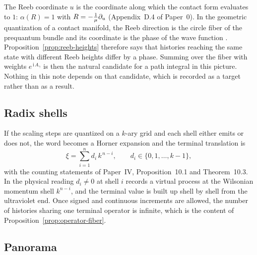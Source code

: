 \begin{remark}
\label{rem:prequantum}
The Reeb coordinate $u$ is the coordinate along which the contact form evaluates
to $1$: $\alpha(R)=1$ with $R=-\tfrac1\mu\partial_u$ (Appendix~D.4 of Paper~0).  In
the geometric quantization of a contact manifold, the Reeb direction is the
circle fiber of the prequantum bundle and its coordinate is the phase of the
wave function \cite{Geiges2008,BoothbyWang1958}.  Proposition~\ref{prop:reeb-heights}
therefore says that histories reaching the same state with different Reeb
heights differ by a phase.  Summing over the fiber with weights
$e^{\,\mathrm i\,A_\gamma}$ is then the natural candidate for a path integral in
this picture.  Nothing in this note depends on that candidate, which is recorded
as a target rather than as a result.
\end{remark}

\subsection{Radix shells}

If the scaling steps are quantized on a $k$-ary grid and each shell either emits
or does not, the word becomes a Horner expansion and the terminal translation is
\begin{equation}\label{eq:horner}
  \xi=\sum_{i=1}^{n}d_i\,k^{\,n-i},
  \qquad d_i\in\{0,1,\dots,k-1\},
\end{equation}
with the counting statements of Paper~IV, Proposition~10.1 and Theorem~10.3.  In
the physical reading $d_i\ne0$ at shell $i$ records a virtual process at the
Wilsonian momentum shell $k^{n-i}$, and the terminal value is built up shell by
shell from the ultraviolet end.  Once signed and continuous increments are
allowed, the number of histories sharing one terminal operator is infinite,
which is the content of Proposition~\ref{prop:operator-fiber}.

\subsection{Panorama}

